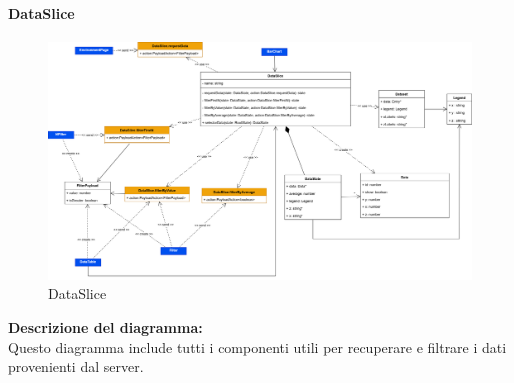 \paragraph{DataSlice}
\begin{figure}[h!] \centering
      \includegraphics[scale=0.15]{template/images/uml_front/logic/DataSlice.png}
      \caption{DataSlice}
\end{figure}
\textbf{Descrizione del diagramma:}\\
Questo diagramma include tutti i componenti utili per recuperare e filtrare i dati provenienti dal server.
